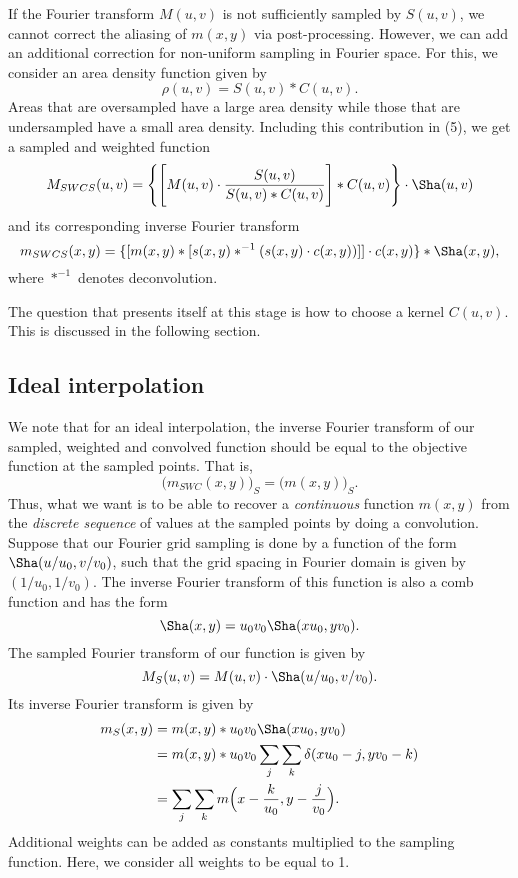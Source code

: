If the Fourier transform $M(u,v)$ is not sufficiently sampled by $S(u,v)$, we cannot correct the aliasing of $m(x,y)$ via post-processing. However, we can add an additional correction for non-uniform sampling in Fourier space. For this, we consider an area density function given by
\begin{equation}
\rho(u,v) = S(u,v) \ast C(u,v).
\end{equation}
Areas that are oversampled have a large area density while those that are undersampled have a small area density. Including this contribution in (5), we get a sampled and weighted function
\begin{equation}
M_{SWCS}(u,v) = \Bigg\{\Bigg[M(u,v) \cdot \frac{S(u,v)}{S(u,v) \ast C(u,v)}\Bigg] \ast C(u,v)\Bigg\} \cdot \Sha(u,v)
\end{equation}
and its corresponding inverse Fourier transform
\begin{equation}
m_{SWCS}(x,y) =  \{[m(x,y) \ast [s(x,y) \ast^{-1} (s(x,y) \cdot c(x,y))]] \cdot c(x,y)\} \ast \Sha(x,y),
\end{equation}
where $\ast^{-1}$ denotes deconvolution.

The question that presents itself at this stage is how to choose a kernel $C(u,v)$. This is discussed in the following section.
\subsection{Ideal interpolation}
We note that for an ideal interpolation, the inverse Fourier transform of our sampled, weighted and convolved function should be equal to the objective function at the sampled points. That is,
\begin{equation}
\Bigg(m_{SWC}(x,y)\Bigg)_S = \Bigg(m(x,y)\Bigg)_S.
\end{equation}
Thus, what we want is to be able to recover a \emph{continuous} function $m(x,y)$ from the \emph{discrete sequence} of values at the sampled points by doing a convolution.
Suppose that our Fourier grid sampling is done by a function of the form $\Sha(u/u_0,v/v_0)$, such that the grid spacing in Fourier domain is given by $(1/u_0, 1/v_0)$. The inverse Fourier transform of this function is also a comb function and has the form
\begin{equation}
\Sha(x,y) = u_0 v_0 \Sha(xu_0, yv_0).
\end{equation}
The sampled Fourier transform of our function is given by
\begin{equation}
M_{S}(u,v) = M(u,v) \cdot \Sha(u/u_0, v/v_0).
\end{equation}
Its inverse Fourier transform is given by
\begin{align}
m_{S}(x,y) &= m(x,y) \ast u_0v_0\Sha(xu_0, yv_0)\\
&= m(x,y) \ast u_0v_0\sum_j \sum_k \delta(xu_0-j, yv_0-k)\\
&=\sum_j \sum_k m\Big(x - \frac{k}{u_0}, y - \frac{j}{v_0}\Big).
\end{align}
Additional weights can be added as constants multiplied to the sampling function. Here, we consider all weights to be equal to 1.

